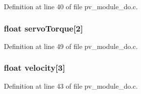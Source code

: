 Definition at line 40 of file pv\+\_\+module\+\_\+do.\+c.

\subsubsection[{\texorpdfstring{servo\+Torque}{servoTorque}}]{\setlength{\rightskip}{0pt plus 5cm}float servo\+Torque\mbox{[}2\mbox{]}}\hypertarget{group__app__do_gaa56fed06b51b312e13aa20c0c740795e}{}\label{group__app__do_gaa56fed06b51b312e13aa20c0c740795e}


Definition at line 49 of file pv\+\_\+module\+\_\+do.\+c.

\subsubsection[{\texorpdfstring{velocity}{velocity}}]{\setlength{\rightskip}{0pt plus 5cm}float velocity\mbox{[}3\mbox{]}}\hypertarget{group__app__do_ga63a3bb0717d926f2f94b982b96e92237}{}\label{group__app__do_ga63a3bb0717d926f2f94b982b96e92237}


Definition at line 43 of file pv\+\_\+module\+\_\+do.\+c.

